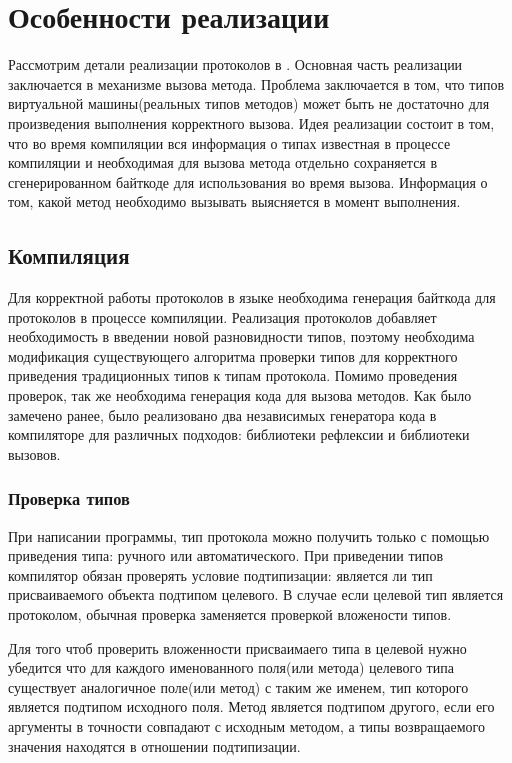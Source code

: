 \section{Особенности реализации}
Рассмотрим детали реализации протоколов в . Основная часть реализации заключается в механизме вызова метода. Проблема заключается в том, что типов виртуальной машины(реальных типов методов) может быть не достаточно для произведения выполнения корректного вызова. Идея реализации состоит в том, что во время компиляции вся информация о типах известная в процессе компиляции и необходимая для вызова метода отдельно сохраняется в сгенерированном байткоде для использования во время вызова. Информация о том, какой метод необходимо вызывать выясняется в момент выполнения.

\subsection{Компиляция}
Для корректной работы протоколов в языке необходима генерация байткода для протоколов в процессе компиляции. Реализация протоколов добавляет необходимость в введении новой разновидности типов, поэтому необходима модификация существующего алгоритма проверки типов для корректного приведения традиционных типов к типам протокола. Помимо проведения проверок, так же необходима генерация кода для вызова методов. Как было замечено ранее, было реализовано два независимых генератора кода в компиляторе для различных подходов: библиотеки рефлексии и библиотеки вызовов.

\subsubsection{Проверка типов}
При написании программы, тип протокола можно получить только с помощью приведения типа: ручного или автоматического. При приведении типов компилятор обязан проверять условие подтипизации: является ли тип присваиваемого объекта подтипом целевого. В случае если целевой тип является протоколом, обычная проверка заменяется проверкой вложености типов.

Для того чтоб проверить вложенности присваимаего типа в целевой нужно убедится что для каждого именованного поля(или метода) целевого типа существует аналогичное поле(или метод) с таким же именем, тип которого является подтипом исходного поля. Метод является подтипом другого, если его аргументы в точности совпадают с исходным методом, а типы возвращаемого значения находятся в отношении подтипизации.


